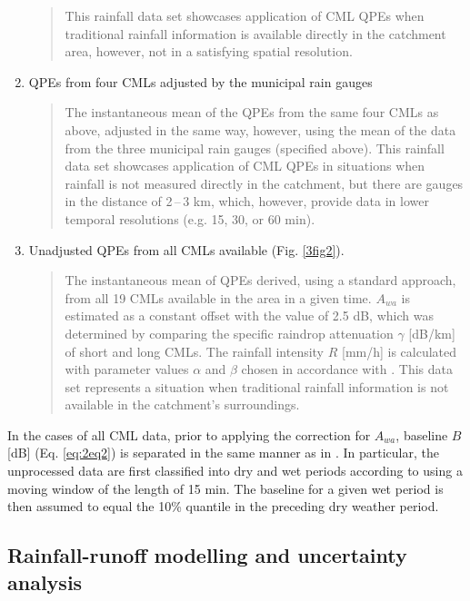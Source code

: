 \documentclass{ctuthesis}\usepackage[]{graphicx}\usepackage[]{color}
\begin{document}
\begin{enumerate}
\begin{quote}
                This rainfall data set showcases application of CML QPEs when traditional rainfall information is available directly in the catchment area, however, not in a satisfying spatial resolution.
                \end{quote}
        \item QPEs from four CMLs adjusted by the municipal rain gauges 
                \begin{quote}
                The instantaneous mean of the QPEs from the same four CMLs as above, adjusted in the same way, however, using the mean of the data from the three municipal rain gauges (specified above).
                This rainfall data set showcases application of CML QPEs in situations when rainfall is not measured directly in the catchment, but there are gauges in the distance of 2\,--\,3 km, which, however, provide data in lower temporal resolutions (e.g. 15, 30, or 60 min).
                \end{quote}
        \item Unadjusted QPEs from all CMLs available (Fig. \ref{3fig2}).
                \begin{quote}
                The instantaneous mean of QPEs derived, using a standard approach, from all 19 CMLs available in the area in a given time. $A_{wa}$ is estimated as a constant offset with the value of 2.5 dB, which was determined by comparing the specific raindrop attenuation $\gamma$ [dB/km] of short and long CMLs. The rainfall intensity $R$ [mm/h] is calculated with parameter values $\alpha$ and $\beta$ chosen in accordance with \cite{recommendation2005838}.
                This data set represents a situation when traditional rainfall information is not available in the catchment's surroundings.
                \end{quote}
\end{enumerate}

In the cases of all CML data, prior to applying the correction for $A_{wa}$, baseline $B$ [dB] (Eq. \ref{eq:2eq2}) is separated in the same manner as in \cite{fenclGaugeadjustedRainfallEstimates2017}. In particular, the unprocessed data are first classified into dry and wet periods according to \cite{schleissIdentificationDryRainy2010} using a moving window of the length of 15 min. The baseline for a given wet period is then assumed to equal the 10\% quantile in the preceding dry weather period.



\subsection{Rainfall-runoff modelling and uncertainty analysis} \label{Pilot_UncAn}
\end{document}
